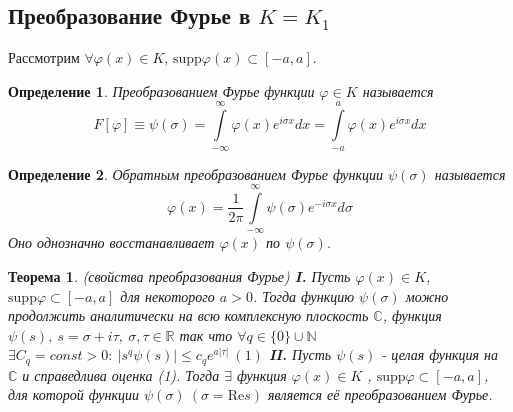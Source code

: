 \documentclass[9pt, a4paper]{article}
\newtheorem*{theorem}{Теорема}
\newtheorem*{definition}{Определение}
\begin{document}
	\subsection{Преобразование Фурье в $K=K_1$}
		Рассмотрим $\forall \varphi(x) \in K$, $\mathrm{supp}\varphi(x) \subset [-a, a]$.\newline
		\begin{definition}
			Преобразованием Фурье функции $\varphi \in K$ называется 
			\begin{equation*}
				F[\varphi] \equiv \psi(\sigma) = \int\limits_{-\infty}^{\infty} \varphi(x) e^{i\sigma x} dx = \int\limits_{-a}^{a} \varphi(x) e^{i\sigma x} dx
			\end{equation*}
		\end{definition}
		\begin{definition}
			Обратным преобразованием Фурье функции $\psi(\sigma)$ называется
			\begin{equation*}
				\varphi(x) = \dfrac{1}{2\pi}\int\limits_{-\infty}^{\infty} \psi(\sigma) e^{-i\sigma x} d \sigma
			\end{equation*}
			Оно однозначно восстанавливает $\varphi(x)$ по $\psi(\sigma)$.
		\end{definition}
		\begin{theorem}
			(свойства преобразования Фурье)\newline
			\textbf{I.} Пусть $\varphi(x) \in K$, $\mathrm{supp} \varphi \subset [-a, a]$ для некоторого $ a > 0$. Тогда функцию $\psi(\sigma)$ можно продолжить аналитически на всю комплексную плоскость $\mathbb{C}$, функция $\psi(s), \ s = \sigma + i \tau, \ \sigma, \tau \in \mathbb{R}$ так что $\forall q \in \{0\} \cup \mathbb{N}$ $\exists C_q = const > 0: \ |s^q \psi(s) | \leq c_q e^{a|\tau|} \ (1)$\newline
			\textbf{II.} Пусть $\psi(s)$ - целая функция на $\mathbb{C}$ и справедлива оценка (1). Тогда $\exists$ функция $\varphi(x) \in K$ , $\mathrm{supp} \varphi \subset [-a, a]$, для которой функции $\psi(\sigma)\ (\sigma = \mathrm{Re} s)$ является её преобразованием Фурье.
		\end{theorem}
\end{document}
